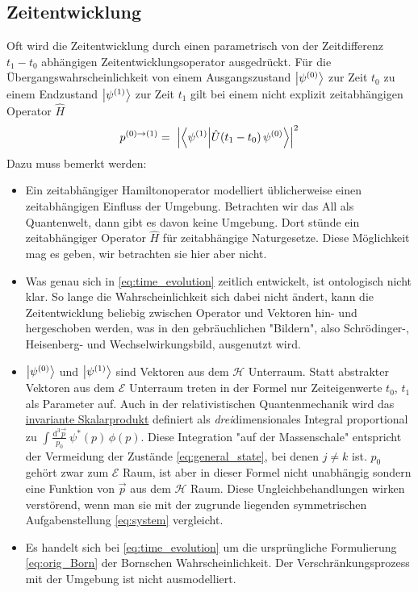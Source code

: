 \documentclass[12pt]{article}
\begin{document}
\subsection{Zeitentwicklung}
Oft wird die Zeitentwicklung durch einen parametrisch von der Zeitdifferenz $t_1-t_0$ abhängigen Zeitentwicklungsoperator ausgedrückt. Für die Übergangswahrscheinlichkeit von einem Ausgangszustand $\ket{\psi^{(0)}}$ zur Zeit $t_0$ zu einem Endzustand $\ket{\psi^{(1)}}$ zur Zeit $t_1$ gilt bei einem nicht explizit zeitabhängigen Operator $\hat{H}$
\begin{equation} 
\label{eq:time_evolution}
p^{(0)\rightarrow(1)} =\ \Bigl| \bra{\psi^{(1)}}\ket{\hat{U}(t_1-t_0)\,\psi^{(0)}} \Bigr|^2
\end{equation}
Dazu muss bemerkt werden:
\begin{itemize}
\item Ein zeitabhängiger Hamiltonoperator modelliert üblicherweise einen zeitabhängigen Einfluss der Umgebung. Betrachten wir das All als Quantenwelt, dann gibt es davon keine Umgebung. Dort stünde ein zeitabhängiger Operator $\hat{H}$ für zeitabhängige Naturgesetze. Diese Möglichkeit mag es geben, wir betrachten sie hier aber nicht.
\item Was genau sich in \eqref{eq:time_evolution} zeitlich entwickelt, ist ontologisch nicht klar. So lange die Wahrscheinlichkeit sich dabei nicht ändert, kann die Zeitentwicklung beliebig zwischen Operator und Vektoren hin- und hergeschoben werden, was in den gebräuchlichen "Bildern", also Schrödinger-, Heisenberg- und Wechselwirkungsbild, ausgenutzt wird.
\item $\ket{\psi^{(0)}}$ und $\ket{\psi^{(1)}}$ sind Vektoren aus dem $\mathscr{H}$ Unterraum. Statt abstrakter Vektoren aus dem $\mathscr{E}$ Unterraum treten in der Formel nur Zeiteigenwerte $t_0$, $t_1$ als Parameter auf. Auch in der relativistischen Quantenmechanik wird das \href{http://www.itp.uni-bremen.de/~noack/dirac.pdf}{invariante Skalarprodukt} definiert als \emph{drei}dimensionales Integral proportional zu 
$\int \frac{\mathrm{d}^3 \vec{p}}{p_0}\ \psi^*(p)\, \phi(p)$. Diese Integration "auf der Massenschale" entspricht der Vermeidung der Zustände \eqref{eq:general_state}, bei denen $j \neq k$ ist. $p_0$ gehört zwar zum $\mathscr{E}$ Raum, ist aber in dieser Formel nicht unabhängig sondern eine Funktion von $\vec{p}$ aus dem $\mathscr{H}$ Raum. Diese Ungleichbehandlungen wirken verstörend, wenn man sie mit der zugrunde liegenden symmetrischen Aufgabenstellung \eqref{eq:system} vergleicht.
\item Es handelt sich bei \eqref{eq:time_evolution} um die ursprüngliche Formulierung \eqref{eq:orig_Born} der Bornschen Wahrscheinlichkeit. Der Verschränkungsprozess mit der Umgebung ist nicht ausmodelliert.
\end{itemize}
\end{document}
